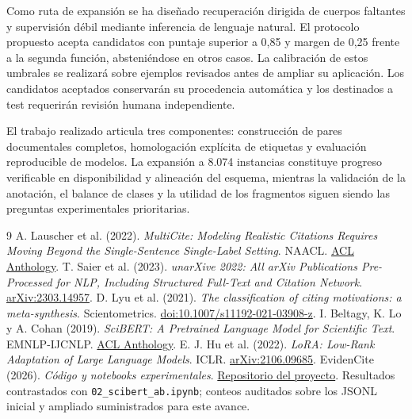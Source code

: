 \documentclass[10pt,a4paper,twocolumn]{article}
\begin{document}
Como ruta de expansión se ha diseñado recuperación dirigida de cuerpos faltantes y supervisión débil mediante inferencia de lenguaje natural. El protocolo propuesto acepta candidatos con puntaje superior a 0,85 y margen de 0,25 frente a la segunda función, absteniéndose en otros casos. La calibración de estos umbrales se realizará sobre ejemplos revisados antes de ampliar su aplicación. Los candidatos aceptados conservarán su procedencia automática y los destinados a test requerirán revisión humana independiente.

El trabajo realizado articula tres componentes: construcción de pares documentales completos, homologación explícita de etiquetas y evaluación reproducible de modelos. La expansión a 8.074 instancias constituye progreso verificable en disponibilidad y alineación del esquema, mientras la validación de la anotación, el balance de clases y la utilidad de los fragmentos siguen siendo las preguntas experimentales prioritarias.

\begin{thebibliography}{9}\small
{} A. Lauscher et al. (2022). \emph{MultiCite: Modeling Realistic Citations Requires Moving Beyond the Single-Sentence Single-Label Setting}. NAACL. \href{https://aclanthology.org/2022.naacl-main.137/}{ACL Anthology}.
 T. Saier et al. (2023). \emph{unarXive 2022: All arXiv Publications Pre-Processed for NLP, Including Structured Full-Text and Citation Network}. \href{https://arxiv.org/abs/2303.14957}{arXiv:2303.14957}.
 D. Lyu et al. (2021). \emph{The classification of citing motivations: a meta-synthesis}. Scientometrics. \href{https://doi.org/10.1007/s11192-021-03908-z}{doi:10.1007/s11192-021-03908-z}.
 I. Beltagy, K. Lo y A. Cohan (2019). \emph{SciBERT: A Pretrained Language Model for Scientific Text}. EMNLP-IJCNLP. \href{https://aclanthology.org/D19-1371/}{ACL Anthology}.
 E. J. Hu et al. (2022). \emph{LoRA: Low-Rank Adaptation of Large Language Models}. ICLR. \href{https://arxiv.org/abs/2106.09685}{arXiv:2106.09685}.
 EvidenCite (2026). \emph{Código y notebooks experimentales}. \href{https://github.com/d-leandro/EvidenCite/tree/main/notebooks}{Repositorio del proyecto}. Resultados contrastados con \texttt{02\_scibert\_ab.ipynb}; conteos auditados sobre los JSONL inicial y ampliado suministrados para este avance.
\end{thebibliography}
\end{document}
